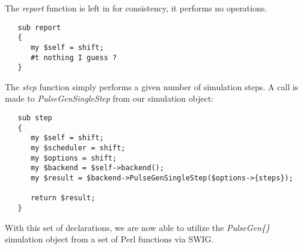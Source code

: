 \documentclass[12pt]{article}
\begin{document}
The {\it report} function is left in for consistency, it performs no operations.
\begin{verbatim}
   sub report
   {
      my $self = shift;
      #t nothing I guess ?
   }
\end{verbatim}
The {\it step} function simply performs a given number of simulation steps. A call is made to {\it PulseGenSingleStep} from our simulation object:
\begin{verbatim}
   sub step
   {
      my $self = shift;
      my $scheduler = shift;
      my $options = shift;
      my $backend = $self->backend();
      my $result = $backend->PulseGenSingleStep($options->{steps});

      return $result;
   }
\end{verbatim}
With this set of declarations, we are now able to utilize the {\it PulseGen\{\}} simulation object from a set of Perl functions via SWIG. 
\end{document}
